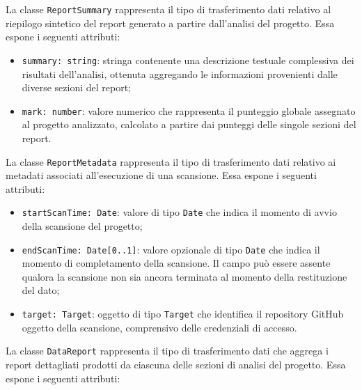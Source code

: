 \documentclass[a4paper, 11pt]{article}
\newcounter{subsubsubsection}[subsubsection]
\begin{document}
\label{sec:ReportSummary}
 
La classe \texttt{ReportSummary} rappresenta il tipo di trasferimento dati relativo al riepilogo
sintetico del report generato a partire dall'analisi del progetto. Essa espone i seguenti attributi:
 
\begin{itemize}
  \item \texttt{summary: string}: stringa contenente una descrizione testuale complessiva dei
    risultati dell'analisi, ottenuta aggregando le informazioni provenienti dalle diverse sezioni
    del report;
 
  \item \texttt{mark: number}: valore numerico che rappresenta il punteggio globale assegnato al
    progetto analizzato, calcolato a partire dai punteggi delle singole sezioni del report.
\end{itemize}
 

 
\label{sec:ReportMetadata}
 
La classe \texttt{ReportMetadata} rappresenta il tipo di trasferimento dati relativo ai metadati
associati all'esecuzione di una scansione. Essa espone i seguenti attributi:
 
\begin{itemize}
  \item \texttt{startScanTime: Date}: valore di tipo \texttt{Date} che indica il momento di avvio
    della scansione del progetto;
 
  \item \texttt{endScanTime: Date[0..1]}: valore opzionale di tipo \texttt{Date} che indica il
    momento di completamento della scansione. Il campo può essere assente qualora la scansione
    non sia ancora terminata al momento della restituzione del dato;
 
  \item \texttt{target: Target}: oggetto di tipo \texttt{Target} che identifica il repository
    GitHub oggetto della scansione, comprensivo delle credenziali di accesso.
\end{itemize}

\label{sec:DataReport}
 
La classe \texttt{DataReport} rappresenta il tipo di trasferimento dati che aggrega i report
dettagliati prodotti da ciascuna delle sezioni di analisi del progetto. Essa espone i seguenti
attributi:
 
\end{document}
